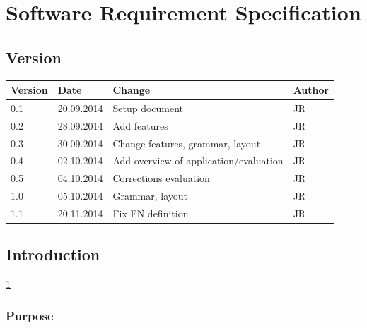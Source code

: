 
\chapter{Software Requirement Specification} %

\label{Software Requirement Specification} %



\section{Version}

\begin{tabular}{| p{1.5cm} | p{2cm} | p{9cm} | p{1.5cm} |}
	\hline
	Version & Date 		& Change & Author \\ \hline
	0.1 	& 20.09.2014 	& Setup document  										& JR \\ \hline
	0.2 	& 28.09.2014		& Add features										& JR \\ \hline
	0.3 	& 30.09.2014		& Change features, grammar, layout					& JR \\ \hline
	0.4 	& 02.10.2014		& Add overview of application/evaluation			& JR \\ \hline
	0.5 	& 04.10.2014		& Corrections evaluation 							& JR \\ \hline
	1.0 	& 05.10.2014		& Grammar, layout 									& JR \\ \hline
	1.1 	& 20.11.2014		& Fix FN definition									& JR \\ \hline

\end{tabular}

\section{Introduction}

\ref{Software Requirement Specification}


\subsection{Purpose}

